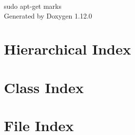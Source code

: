 \documentclass[twoside]{book}
\newcommand{\+}{\discretionary{\mbox{\scriptsize$\hookleftarrow$}}{}{}}
\newcommand{\clearemptydoublepage}{%
    \newpage{\pagestyle{empty}\cleardoublepage}%
  }
\begin{document}
  \raggedbottom
    \hypersetup{pageanchor=false,
                bookmarksnumbered=true,
                pdfencoding=unicode
               }
  \begin{titlepage}
  \vspace*{7cm}
  \begin{center}%
  {\Large sudo apt-\/get marks}\\
  \vspace*{1cm}
  {\large Generated by Doxygen 1.12.0}\\
  \end{center}
  \end{titlepage}
  \clearemptydoublepage
  \tableofcontents
  \clearemptydoublepage
  \hypersetup{pageanchor=true}
\chapter{Hierarchical Index}

\chapter{Class Index}

\chapter{File Index}

\end{document}
